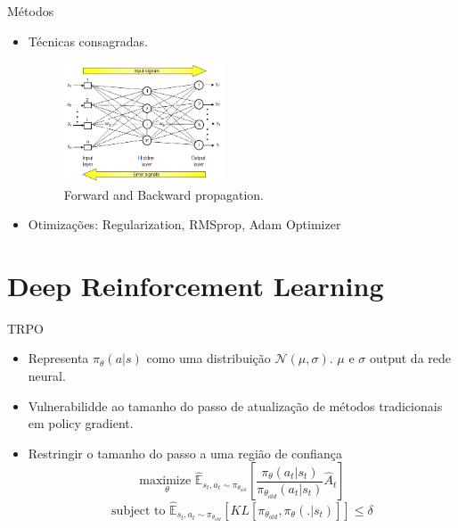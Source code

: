 \documentclass{beamer}
\begin{document}
\begin{frame}{Métodos}
\begin{itemize}
\item
	Técnicas consagradas.
\begin{figure}[H]
    \centering
    \includegraphics[width=0.45\textwidth]{figures/Feed-Forward-Neural-Network-with-Back-Propagation.png} 
    \caption{Forward and Backward propagation.}
    \label{fig:RL_basic_model}
\end{figure}
\item
	Otimizações: Regularization, RMSprop, Adam Optimizer
\end{itemize}
\end{frame}


\section{Deep Reinforcement Learning}

\begin{frame}{TRPO}
\begin{itemize}
\item
	Representa $\pi_{\theta}(a|s)$ como uma distribuição $\mathcal{N}(\mu,\sigma)$. $\mu$ e $\sigma$ output da rede neural.
\item
	Vulnerabilidde ao tamanho do passo de atualização de métodos tradicionais em policy gradient.
\item
	Restringir o tamanho do passo a uma região de confiança
\begin{equation}
\underset{\theta}{\textrm{maximize }} \mathbb{\hat{E}}_{s_t,a_t \sim \pi_{\theta_{old}} } \left[ \frac{\pi_{\theta}(a_t|s_t)}{
\pi_{\theta_{old}}(a_t|s_t)}\hat{A}_t \right]
\label{eq:TRPO_1}
\end{equation}
\begin{equation}
\textrm{subject to } \mathbb{\hat{E}}_{s_t,a_t \sim \pi_{\theta_{old}} } \left[ KL[\pi_{\theta_{old}},\pi_{\theta}(.|s_t)] \right] \leq \delta
\label{eq:TRPO_2}
\end{equation}
\end{itemize}
\end{frame}
\end{document}
